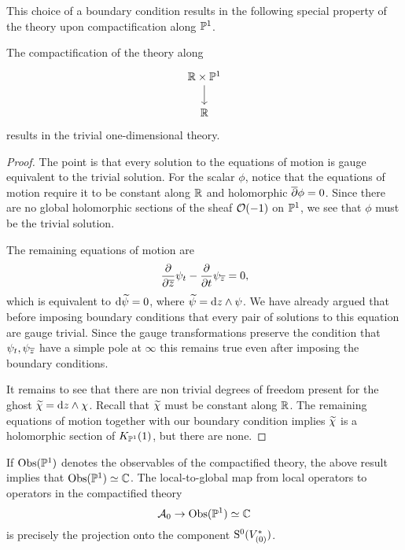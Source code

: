 \documentclass[11pt]{amsart}
\begin{document}
This choice of a boundary condition results in the following special property of the theory upon compactification along $\mathbb P^1$.

\begin{lem}\label{lem:compactP1}
The compactification of the theory along 
\[
\begin{tikzcd}
\RR \times \PP^1 \ar[d] \\ \RR
\end{tikzcd}
\]
results in the trivial one-dimensional theory. 
\end{lem}
\begin{proof}
The point is that every solution to the equations of motion is gauge equivalent to the trivial solution. 
For the scalar $\phi$, notice that the equations of motion require it to be constant along $\mathbb R$ and holomorphic $\overline{\partial} \phi = 0$. 
Since there are no global holomorphic sections of the sheaf $\mathcal O(-1)$ on $\mathbb P^1$, we see that $\phi$ must be the trivial solution. 

The remaining equations of motion are
\[
\frac{\partial}{\partial {\overline{z}}} \psi_t - \frac{\partial}{\partial t} \psi_{\overline{z}} = 0 ,
\]
which is equivalent to ${\rm d} \widetilde \psi = 0$, where $\widetilde \psi = {\rm d} z \wedge \psi$. 
We have already argued that before imposing boundary conditions that every pair of solutions to this equation are gauge trivial. 
Since the gauge transformations preserve the condition that $\psi_t, \psi_{{\overline{z}}}$ have a simple pole at $\infty$ this remains true even after imposing the boundary conditions. 

It remains to see that there are non trivial degrees of freedom present for the ghost $\widetilde\chi = {\rm d} z \wedge \chi$. 
Recall that $\widetilde\chi$ must be constant along $\mathbb R$.
The remaining equations of motion together with our boundary condition implies $\widetilde \chi$ is a holomorphic section of $K_{\mathbb P^1}(1)$, but there are none. 
\end{proof}

If ${\rm Obs}(\mathbb P^1)$ denotes the observables of the compactified theory, the above result implies that ${\rm Obs}(\mathbb P^1) \simeq \mathbb C$. 
The local-to-global map from local operators to operators in the compactified theory
\[
\mathcal A_0 \to {\rm Obs}(\mathbb P^1) \simeq \mathbb C
\]
is precisely the projection onto the component ${\rm S}^0(V^*_{(0)})$. 

\end{document}
